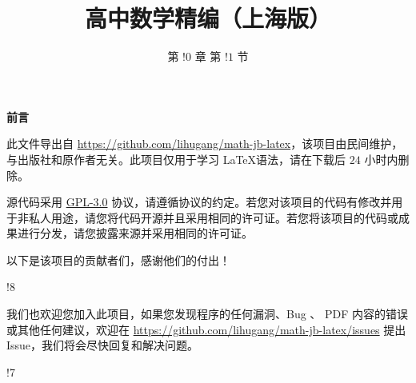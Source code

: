 \documentclass{article}
\title{高中数学精编（上海版）}
\author{第 $!0$ 章 \quad 第 $!1$ 节}
\begin{document}
\maketitle

\newpage

\pagestyle{fancy}
\renewcommand{\footrulewidth}{0pt}
\renewcommand{\headrulewidth}{0pt}
\fancyfoot[C]{\thepage}

\begin{center}
    \Large \textbf{前言}
\end{center}

此文件导出自 \url{https://github.com/lihugang/math-jb-latex}，该项目由民间维护，与出版社和原作者无关。此项目仅用于学习 \LaTeX 语法，请在下载后 $24$ 小时内删除。

源代码采用 \href{https://github.com/lihugang/math-jb-latex/blob/master/LICENSE}{GPL-3.0} 协议，请遵循协议的约定。若您对该项目的代码有修改并用于非私人用途，请您将代码开源并且采用相同的许可证。若您将该项目的代码或成果进行分发，请您披露来源并采用相同的许可证。

\vspace{0.5cm}

以下是该项目的贡献者们，感谢他们的付出！

!8

\vspace{0.5cm}

我们也欢迎您加入此项目，如果您发现程序的任何漏洞、Bug 、 PDF 内容的错误或其他任何建议，欢迎在 \url{https://github.com/lihugang/math-jb-latex/issues} 提出 Issue，我们将会尽快回复和解决问题。

\newpage



!7
\end{document}
